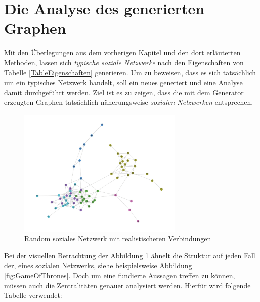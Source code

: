 \section{Die Analyse des generierten Graphen}
Mit den Überlegungen aus dem vorherigen Kapitel und den dort erläuterten Methoden, lassen sich \textit{typische soziale Netzwerke} nach den Eigenschaften von Tabelle \ref{TableEigenschaften} generieren. Um zu beweisen, dass es sich tatsächlich um ein typisches Netzwerk handelt, soll ein neues generiert und eine Analyse damit durchgeführt werden. Ziel ist es zu zeigen, dass die mit dem Generator erzeugten Graphen tatsächlich näherungsweise \textit{sozialen Netzwerken} entsprechen.

\FloatBarrier
\begin{figure}[h!]
    \centering
    \hspace*{-2cm}
    \includegraphics[width=0.7\textwidth]{Graphics/Random_moreConnections.jpg}
    \caption{Random soziales Netzwerk mit realistischeren Verbindungen}
    \label{fig:SNA}
\end{figure}

\FloatBarrier

Bei der visuellen Betrachtung der Abbildung \ref{fig:SNA} ähnelt die Struktur auf jeden Fall der, eines sozialen Netzwerks, siehe beispielsweise Abbildung \ref{fig:GameOfThrones}. Doch um eine fundierte Aussagen treffen zu können, müssen auch die Zentralitäten genauer analysiert werden. Hierfür wird folgende Tabelle verwendet:

